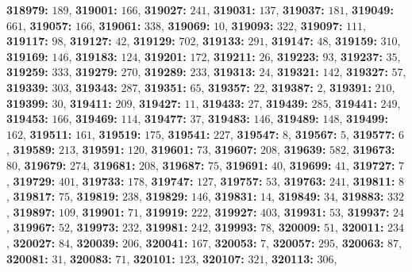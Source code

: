 \textsf{\bfseries 318979:} $189$, \textsf{\bfseries 319001:} $166$, \textsf{\bfseries 319027:} $241$, \textsf{\bfseries 319031:} $137$, \textsf{\bfseries 319037:} $181$, \textsf{\bfseries 319049:} $661$, \textsf{\bfseries 319057:} $166$, \textsf{\bfseries 319061:} $338$, \textsf{\bfseries 319069:} $10$, \textsf{\bfseries 319093:} $322$, \textsf{\bfseries 319097:} $111$, \textsf{\bfseries 319117:} $98$, \textsf{\bfseries 319127:} $42$, \textsf{\bfseries 319129:} $702$, \textsf{\bfseries 319133:} $291$, \textsf{\bfseries 319147:} $48$, \textsf{\bfseries 319159:} $310$, \textsf{\bfseries 319169:} $146$, \textsf{\bfseries 319183:} $124$, \textsf{\bfseries 319201:} $172$, \textsf{\bfseries 319211:} $26$, \textsf{\bfseries 319223:} $93$, \textsf{\bfseries 319237:} $35$, \textsf{\bfseries 319259:} $333$, \textsf{\bfseries 319279:} $270$, \textsf{\bfseries 319289:} $233$, \textsf{\bfseries 319313:} $24$, \textsf{\bfseries 319321:} $142$, \textsf{\bfseries 319327:} $57$, \textsf{\bfseries 319339:} $303$, \textsf{\bfseries 319343:} $287$, \textsf{\bfseries 319351:} $65$, \textsf{\bfseries 319357:} $22$, \textsf{\bfseries 319387:} $2$, \textsf{\bfseries 319391:} $210$, \textsf{\bfseries 319399:} $30$, \textsf{\bfseries 319411:} $209$, \textsf{\bfseries 319427:} $11$, \textsf{\bfseries 319433:} $27$, \textsf{\bfseries 319439:} $285$, \textsf{\bfseries 319441:} $249$, \textsf{\bfseries 319453:} $166$, \textsf{\bfseries 319469:} $114$, \textsf{\bfseries 319477:} $37$, \textsf{\bfseries 319483:} $146$, \textsf{\bfseries 319489:} $148$, \textsf{\bfseries 319499:} $162$, \textsf{\bfseries 319511:} $161$, \textsf{\bfseries 319519:} $175$, \textsf{\bfseries 319541:} $227$, \textsf{\bfseries 319547:} $8$, \textsf{\bfseries 319567:} $5$, \textsf{\bfseries 319577:} $6$, \textsf{\bfseries 319589:} $213$, \textsf{\bfseries 319591:} $120$, \textsf{\bfseries 319601:} $73$, \textsf{\bfseries 319607:} $208$, \textsf{\bfseries 319639:} $582$, \textsf{\bfseries 319673:} $80$, \textsf{\bfseries 319679:} $274$, \textsf{\bfseries 319681:} $208$, \textsf{\bfseries 319687:} $75$, \textsf{\bfseries 319691:} $40$, \textsf{\bfseries 319699:} $41$, \textsf{\bfseries 319727:} $7$, \textsf{\bfseries 319729:} $401$, \textsf{\bfseries 319733:} $178$, \textsf{\bfseries 319747:} $127$, \textsf{\bfseries 319757:} $53$, \textsf{\bfseries 319763:} $241$, \textsf{\bfseries 319811:} $8$, \textsf{\bfseries 319817:} $75$, \textsf{\bfseries 319819:} $238$, \textsf{\bfseries 319829:} $146$, \textsf{\bfseries 319831:} $14$, \textsf{\bfseries 319849:} $34$, \textsf{\bfseries 319883:} $332$, \textsf{\bfseries 319897:} $109$, \textsf{\bfseries 319901:} $71$, \textsf{\bfseries 319919:} $222$, \textsf{\bfseries 319927:} $403$, \textsf{\bfseries 319931:} $53$, \textsf{\bfseries 319937:} $24$, \textsf{\bfseries 319967:} $52$, \textsf{\bfseries 319973:} $232$, \textsf{\bfseries 319981:} $242$, \textsf{\bfseries 319993:} $78$, \textsf{\bfseries 320009:} $51$, \textsf{\bfseries 320011:} $234$, \textsf{\bfseries 320027:} $84$, \textsf{\bfseries 320039:} $206$, \textsf{\bfseries 320041:} $167$, \textsf{\bfseries 320053:} $7$, \textsf{\bfseries 320057:} $295$, \textsf{\bfseries 320063:} $87$, \textsf{\bfseries 320081:} $31$, \textsf{\bfseries 320083:} $71$, \textsf{\bfseries 320101:} $123$, \textsf{\bfseries 320107:} $321$, \textsf{\bfseries 320113:} $306$, 
